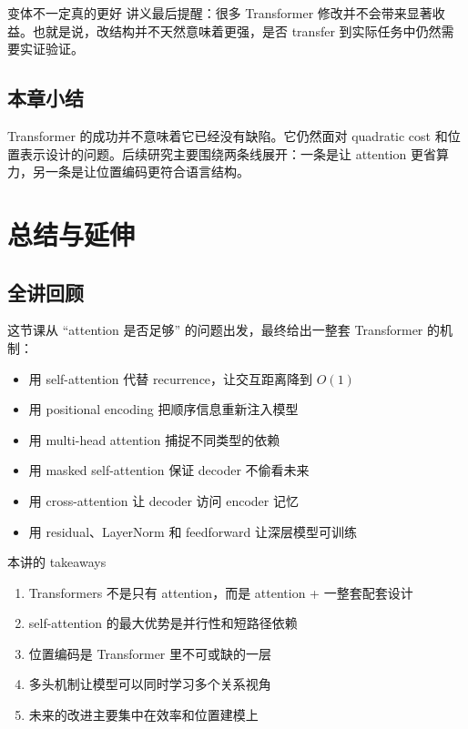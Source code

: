 \documentclass[a4paper]{article}
\begin{document}







\begin{warningbox}{变体不一定真的更好}
讲义最后提醒：很多 Transformer 修改并不会带来显著收益。也就是说，改结构并不天然意味着更强，是否 transfer 到实际任务中仍然需要实证验证。
\end{warningbox}





\subsection{本章小结}

Transformer 的成功并不意味着它已经没有缺陷。它仍然面对 quadratic cost 和位置表示设计的问题。后续研究主要围绕两条线展开：一条是让 attention 更省算力，另一条是让位置编码更符合语言结构。


\section{总结与延伸}

\subsection{全讲回顾}

这节课从 ``attention 是否足够'' 的问题出发，最终给出一整套 Transformer 的机制：
\begin{itemize}
    \item 用 self-attention 代替 recurrence，让交互距离降到 $O(1)$
    \item 用 positional encoding 把顺序信息重新注入模型
    \item 用 multi-head attention 捕捉不同类型的依赖
    \item 用 masked self-attention 保证 decoder 不偷看未来
    \item 用 cross-attention 让 decoder 访问 encoder 记忆
    \item 用 residual、LayerNorm 和 feedforward 让深层模型可训练
\end{itemize}

\begin{importantbox}{本讲的 takeaways}
\begin{enumerate}
    \item Transformers 不是只有 attention，而是 attention + 一整套配套设计
    \item self-attention 的最大优势是并行性和短路径依赖
    \item 位置编码是 Transformer 里不可或缺的一层
    \item 多头机制让模型可以同时学习多个关系视角
    \item 未来的改进主要集中在效率和位置建模上
\end{enumerate}
\end{importantbox}
\end{document}
